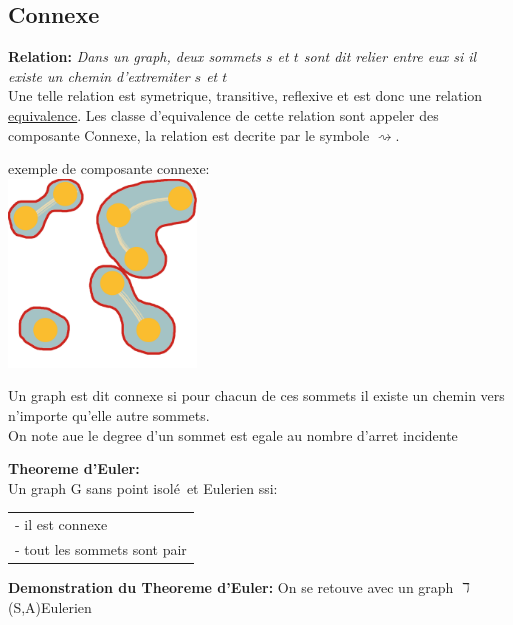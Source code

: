 \documentclass[a4paper,11pt]{article}
\newcommand{\e}{\'{e}}
\begin{document}
    \subsection{Connexe}
    \textbf{Relation:}
    \emph{Dans un graph, deux sommets $s$ et $t$ sont dit relier entre eux si il existe un chemin d'extremiter $s$ et $t$}\\
    Une telle relation est symetrique, transitive, reflexive et est donc une relation \underline{equivalence}.
    Les classe d'equivalence de cette relation sont appeler des composante Connexe, la relation est decrite par le symbole $\rightsquigarrow$.
    \begin{center}
      exemple de composante connexe:\\
     \hfill\includegraphics[width=5cm]{connex.png}\hspace*{\fill}
    \end{center}
    Un graph est dit connexe si pour chacun de ces sommets il existe un chemin vers n'importe qu'elle autre sommets.\\
    On note aue le degree d'un sommet est egale au nombre d'arret incidente
    \begin{center}
      \textbf{\color{LightOrangeHaf}Theoreme d'Euler:}
      \\Un graph G sans point isol\e \ et Eulerien ssi:\\
      \begin{tabular}{@{}l@{}}
        - il est connexe\\
       - tout les sommets sont pair\\
      \end{tabular}
    \end{center}
    \textbf{Demonstration du Theoreme d'Euler:}
    On se retouve avec un graph $\daleth$ (S,A)Eulerien\\
\end{document}
